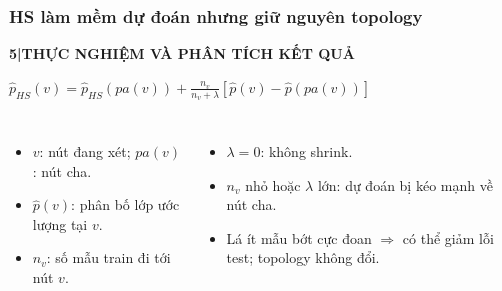 \documentclass[aspectratio=169,12pt]{beamer}
\newcommand{\chaptertag}[2]{%
  \vspace{-0.16cm}%
  {\scriptsize\bfseries\textcolor{boxframe}{#1\enspace |\enspace #2}}\par
  \vspace{0.12cm}%
}
\begin{document}
\begin{frame}
  \frametitle{HS làm mềm dự đoán nhưng giữ nguyên topology}
  \chaptertag{5}{THỰC NGHIỆM VÀ PHÂN TÍCH KẾT QUẢ}
  \begin{tcolorbox}[focusbox,width=0.91\textwidth,top=2mm,bottom=2mm]
    \centering
    $\displaystyle \hat p_{HS}(v)=\hat p_{HS}(pa(v))+
    \frac{n_v}{n_v+\lambda}\left[\hat p(v)-\hat p(pa(v))\right]$
  \end{tcolorbox}
  \vspace{0.16cm}
  \small
  \begin{columns}[T,onlytextwidth]
      \begin{itemize}
        \item $v$: nút đang xét; $pa(v)$: nút cha.
        \item $\hat p(v)$: phân bố lớp ước lượng tại $v$.
        \item $n_v$: số mẫu train đi tới nút $v$.
      \end{itemize}
      \begin{itemize}
        \item $\lambda=0$: không shrink.
        \item $n_v$ nhỏ hoặc $\lambda$ lớn: dự đoán bị kéo mạnh về nút cha.
        \item Lá ít mẫu bớt cực đoan $\Rightarrow$ có thể giảm lỗi test; topology không đổi.
      \end{itemize}
  \end{columns}
\end{frame}
\end{document}
